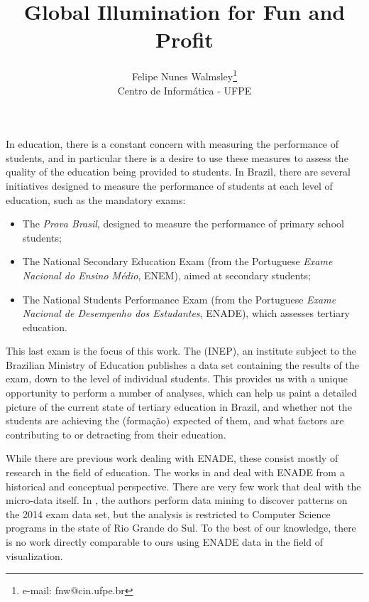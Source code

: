 \documentclass{vgtc}                          %
\title{Global Illumination for Fun and Profit}
\author{Felipe Nunes Walmsley\thanks{e-mail: fnw@cin.ufpe.br}\\ %
        \scriptsize Centro de Informática - UFPE %
}
\begin{document}




\maketitle

In education, there is a constant concern with measuring the performance of students, and in particular there is a desire to use these measures to assess the quality of the education being provided to students. In Brazil, there are several initiatives designed to measure the performance of students at each level of education, such as the mandatory exams:

\begin{itemize}
	\item{The \emph{Prova Brasil}, designed to measure the performance of primary school students;}
	\item{The National Secondary Education Exam (from the Portuguese \emph{Exame Nacional do Ensino Médio}, ENEM), aimed at secondary students;}
	\item{The National Students Performance Exam (from the Portuguese \emph{Exame Nacional de Desempenho dos Estudantes}, ENADE), which assesses tertiary education.}
\end{itemize}

This last exam is the focus of this work. The (INEP), an institute subject to the Brazilian Ministry of Education publishes a data set containing the results of the exam, down to the level of individual students. This provides us with a unique opportunity to perform a number of analyses, which can help us paint a detailed picture of the current state of tertiary education in Brazil, and whether not the students are achieving the (formação) expected of them, and what factors are contributing to or detracting from their education. 

While there are previous work dealing with ENADE, these consist mostly of research in the field of education. The works in \cite{brito2008sinaes} and \cite{verhine2006provao} deal with ENADE from a historical and conceptual perspective. There are very few work that deal with the micro-data itself. In \cite{vista2017tecnicas
}, the authors perform data mining to discover patterns on the 2014 exam data set, but the analysis is restricted to Computer Science programs in the state of Rio Grande do Sul. To the best of our knowledge, there is no work directly comparable to ours using ENADE data in the field of visualization. 
\end{document}
